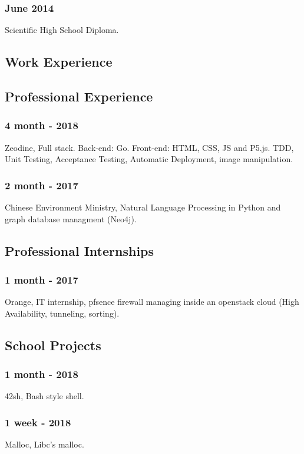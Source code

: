 \documentclass{article}
\begin{document}
        \subsubsection{June 2014}
            Scientific High School Diploma.


    \begin{multicols}{2}
        \section{Work Experience}
            \subsection{Professional Experience}
                \subsubsection{4 month - 2018}
                    Zeodine, Full stack. Back-end: Go. Front-end: HTML, CSS, JS and P5.js.
                    TDD, Unit Testing, Acceptance Testing, Automatic Deployment, image manipulation.
                \subsubsection{2 month - 2017}
                    Chinese Environment Ministry, Natural Language Processing in Python and graph database managment (Neo4j).
            \subsection{Professional Internships}
                \subsubsection{1 month - 2017}
                    Orange, IT internship, pfsence firewall managing inside an openstack cloud (High Availability, tunneling, sorting).
            \subsection{School Projects}
                \subsubsection{1 month - 2018}
                    42sh, Bash style shell.
                \subsubsection{1 week - 2018}
                    Malloc, Libc's malloc.

\end{multicols}
\end{document}
